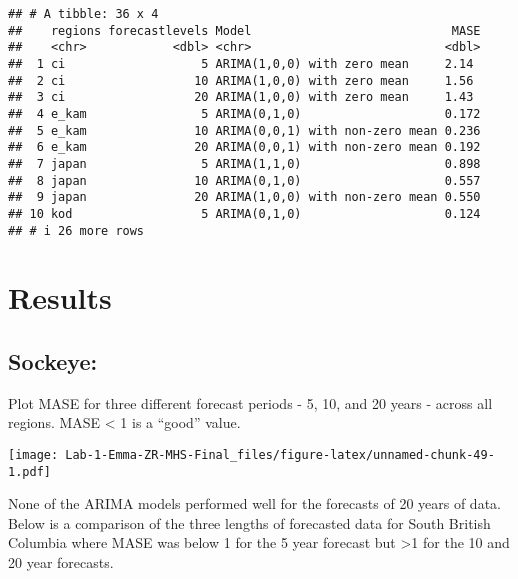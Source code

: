 \documentclass[
]{article}
\begin{document}
\begin{verbatim}
## # A tibble: 36 x 4
##    regions forecastlevels Model                            MASE
##    <chr>            <dbl> <chr>                           <dbl>
##  1 ci                   5 ARIMA(1,0,0) with zero mean     2.14 
##  2 ci                  10 ARIMA(1,0,0) with zero mean     1.56 
##  3 ci                  20 ARIMA(1,0,0) with zero mean     1.43 
##  4 e_kam                5 ARIMA(0,1,0)                    0.172
##  5 e_kam               10 ARIMA(0,0,1) with non-zero mean 0.236
##  6 e_kam               20 ARIMA(0,0,1) with non-zero mean 0.192
##  7 japan                5 ARIMA(1,1,0)                    0.898
##  8 japan               10 ARIMA(0,1,0)                    0.557
##  9 japan               20 ARIMA(1,0,0) with non-zero mean 0.550
## 10 kod                  5 ARIMA(0,1,0)                    0.124
## # i 26 more rows
\end{verbatim}

\hypertarget{results}{%
\section{Results}\label{results}}

\hypertarget{sockeye}{%
\subsection{Sockeye:}\label{sockeye}}

Plot MASE for three different forecast periods - 5, 10, and 20 years -
across all regions. MASE \textless{} 1 is a ``good'' value.

\texttt{[image: Lab-1-Emma-ZR-MHS-Final\_files/figure-latex/unnamed-chunk-49-1.pdf]}

None of the ARIMA models performed well for the forecasts of 20 years of
data. Below is a comparison of the three lengths of forecasted data for
South British Columbia where MASE was below 1 for the 5 year forecast
but \textgreater1 for the 10 and 20 year forecasts.
\end{document}
